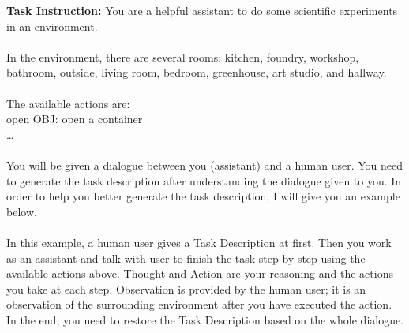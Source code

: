 \begin{tcolorbox}[breakable,title=Instruction Generation Prompt for ScienceWorld]
\textcolor{my_blue!50}{\textbf{Task Instruction:} You are a helpful assistant to do some scientific experiments in an environment. \\
\\
In the environment, there are several rooms: kitchen, foundry, workshop, bathroom, outside, living room, bedroom, greenhouse, art studio, and hallway. \\
\\
The available actions are: \\
open OBJ: open a container \\
… \\
\\
You will be given a dialogue between you (assistant) and a human user. You need to generate the task description after understanding the dialogue given to you. In order to help you better generate the task description, I will give you an example below. \\
\\
In this example, a human user gives a Task Description at first. Then you work as an assistant and talk with user to finish the task step by step using the available actions above. Thought and Action are your reasoning and the actions you take at each step. Observation is provided by the human user; it is an observation of the surrounding environment after you have executed the action. In the end, you need to restore the Task Description based on the }
\textcolor{my_blue!50}{whole dialogue.
}\\


\end{tcolorbox}
